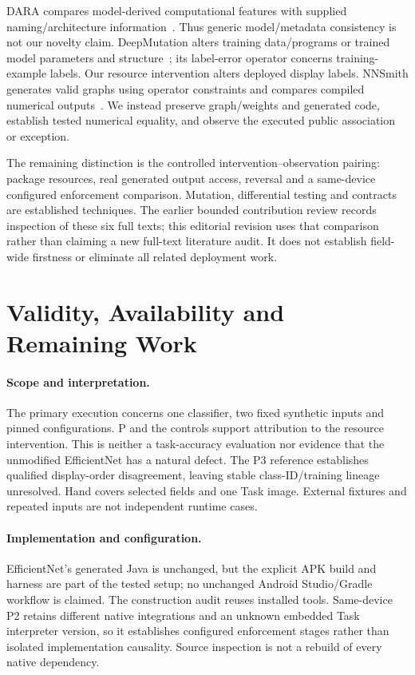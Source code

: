 \documentclass[10pt,conference]{IEEEtran}
\begin{document}
DARA compares model-derived computational features with supplied naming/architecture information~\cite{dara}. Thus generic model/metadata consistency is not our novelty claim. DeepMutation alters training data/programs or trained model parameters and structure~\cite{deepmutation}; its label-error operator concerns training-example labels. Our resource intervention alters deployed display labels. NNSmith generates valid graphs using operator constraints and compares compiled numerical outputs~\cite{nnsmith}. We instead preserve graph/weights and generated code, establish tested numerical equality, and observe the executed public association or exception.

The remaining distinction is the controlled intervention--observation pairing: package resources, real generated output access, reversal and a same-device configured enforcement comparison. Mutation, differential testing and contracts are established techniques. The earlier bounded contribution review records inspection of these six full texts; this editorial revision uses that comparison rather than claiming a new full-text literature audit. It does not establish field-wide firstness or eliminate all related deployment work.

\section{Validity, Availability and Remaining Work}
\label{sec:validity}
\paragraph{Scope and interpretation.}
The primary execution concerns one classifier, two fixed synthetic inputs and pinned configurations. P and the controls support attribution to the resource intervention. This is neither a task-accuracy evaluation nor evidence that the unmodified EfficientNet has a natural defect. The P3 reference establishes qualified display-order disagreement, leaving stable class-ID/training lineage unresolved. Hand covers selected fields and one Task image. External fixtures and repeated inputs are not independent runtime cases.

\paragraph{Implementation and configuration.}
EfficientNet's generated Java is unchanged, but the explicit APK build and harness are part of the tested setup; no unchanged Android Studio/Gradle workflow is claimed. The construction audit reuses installed tools. Same-device P2 retains different native integrations and an unknown embedded Task interpreter version, so it establishes configured enforcement stages rather than isolated implementation causality. Source inspection is not a rebuild of every native dependency.
\end{document}
